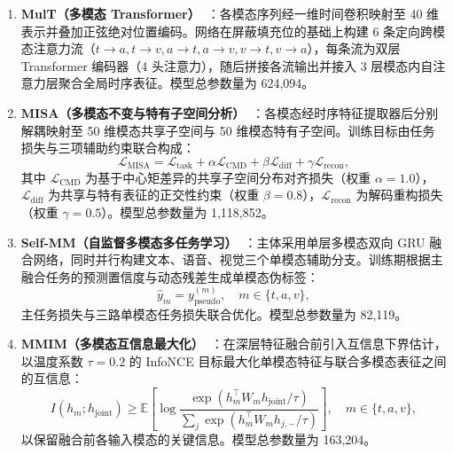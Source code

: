 \documentclass[UTF8,a4paper,11pt]{ctexart}
\begin{document}
\begin{enumerate}[label=(\arabic*),leftmargin=2.5em,itemsep=4pt,topsep=3pt]
  \item \textbf{MulT（多模态 Transformer）~\cite{q2mult}}：各模态序列经一维时间卷积映射至 40 维表示并叠加正弦绝对位置编码。网络在屏蔽填充位的基础上构建 6 条定向跨模态注意力流（$t\to a, t\to v, a\to t, a\to v, v\to t, v\to a$），每条流为双层 Transformer 编码器（4 头注意力），随后拼接各流输出并接入 3 层模态内自注意力层聚合全局时序表征。模型总参数量为 624,094。

  \item \textbf{MISA（多模态不变与特有子空间分析）~\cite{q2misa}}：各模态经时序特征提取器后分别解耦映射至 50 维模态共享子空间与 50 维模态特有子空间。训练目标由任务损失与三项辅助约束联合构成：
  \begin{equation}
    \mathcal{L}_{\text{MISA}} = \mathcal{L}_{\text{task}} + \alpha \mathcal{L}_{\text{CMD}} + \beta \mathcal{L}_{\text{diff}} + \gamma \mathcal{L}_{\text{recon}},
  \end{equation}
  其中 $\mathcal{L}_{\text{CMD}}$ 为基于中心矩差异的共享子空间分布对齐损失（权重 $\alpha=1.0$），$\mathcal{L}_{\text{diff}}$ 为共享与特有表征的正交性约束（权重 $\beta=0.8$），$\mathcal{L}_{\text{recon}}$ 为解码重构损失（权重 $\gamma=0.5$）。模型总参数量为 1,118,852。

  \item \textbf{Self-MM（自监督多模态多任务学习）~\cite{q2selfmm}}：主体采用单层多模态双向 GRU 融合网络，同时并行构建文本、语音、视觉三个单模态辅助分支。训练期根据主融合任务的预测置信度与动态残差生成单模态伪标签：
  \begin{equation}
    \hat{y}_m = y_{\text{pseudo}}^{(m)}, \quad m \in \{t, a, v\},
  \end{equation}
  主任务损失与三路单模态任务损失联合优化。模型总参数量为 82,119。

  \item \textbf{MMIM（多模态互信息最大化）~\cite{q2mmim}}：在深层特征融合前引入互信息下界估计，以温度系数 $\tau = 0.2$ 的 InfoNCE 目标最大化单模态特征与联合多模态表征之间的互信息：
  \begin{equation}
    I(h_m; h_{\text{joint}}) \ge \mathbb{E} \left[ \log \frac{\exp(h_m^\top W_m h_{\text{joint}} / \tau)}{\sum_{j} \exp(h_m^\top W_m h_{j,-} / \tau)} \right], \quad m \in \{t, a, v\},
  \end{equation}
  以保留融合前各输入模态的关键信息。模型总参数量为 163,204。
\end{enumerate}
\end{document}
